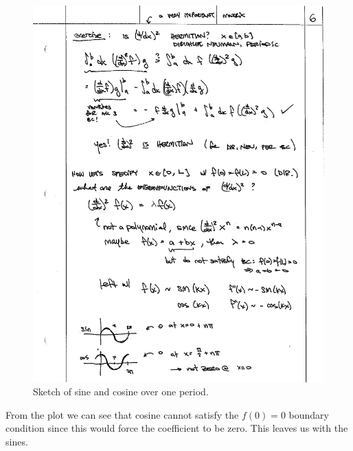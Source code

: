 \documentclass[12pt, oneside]{report}    %
\begin{document}
\begin{figure}[tb]
    \centering
    \includegraphics[width=.7\textwidth]{figures/sinesandcosines.pdf}
    \caption{Sketch of sine and cosine over one period.}
    \label{fig:sinecosine}
\end{figure}
From the plot we can see that cosine cannot satisfy the $f(0)=0$ boundary condition since this would force the coefficient to be zero. This leaves us with the sines. 
\end{document}
